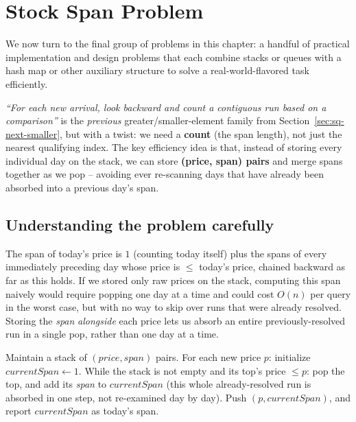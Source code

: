 \section{Stock Span Problem}
\label{sec:sq-stock-span}

\noindent We now turn to the final group of problems in this chapter: a
handful of practical implementation and design problems that each combine
stacks or queues with a hash map or other auxiliary structure to solve a
real-world-flavored task efficiently.


\begin{patternbox}
\emph{``For each new arrival, look backward and count a contiguous run
based on a comparison''} is the \emph{previous} greater/smaller-element
family from Section~\ref{sec:sq-next-smaller}, but with a twist: we need
a \textbf{count} (the span length), not just the nearest qualifying
index. The key efficiency idea is that, instead of storing every
individual day on the stack, we can store \textbf{(price, span) pairs}
and merge spans together as we pop -- avoiding ever re-scanning days that
have already been absorbed into a previous day's span.
\end{patternbox}

\subsection*{Understanding the problem carefully}

The span of today's price is $1$ (counting today itself) plus the spans
of every immediately preceding day whose price is $\le$ today's price,
chained backward as far as this holds. If we stored only raw prices on
the stack, computing this span naively would require popping one day at a
time and could cost $O(n)$ per query in the worst case, but with no way
to skip over runs that were already resolved. Storing the \emph{span}
\emph{alongside} each price lets us absorb an entire previously-resolved
run in a single pop, rather than one day at a time.

\begin{ideabox}
Maintain a stack of $(\textit{price}, \textit{span})$ pairs. For each new
price $p$: initialize $\textit{currentSpan} \gets 1$. While the stack is
not empty and its top's price $\le p$: pop the top, and add its
\textit{span} to $\textit{currentSpan}$ (this whole already-resolved run
is absorbed in one step, not re-examined day by day). Push
$(p, \textit{currentSpan})$, and report $\textit{currentSpan}$ as today's
span.
\end{ideabox}

